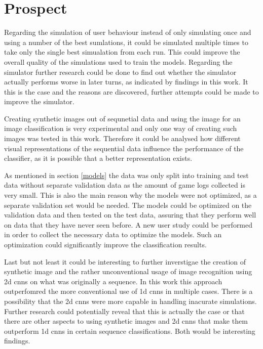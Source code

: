 \section{Prospect}
\label{prospect}
Regarding the simulation of user behaviour instead of only simulating once and using a number of the best sumlations, it could be simulated multiple times to take only the single best simualation from each run. This could improve the overall quality of the simulations used to train the models. Regarding the simulator further research could be done to find out whether the simulator actually performs worse in later turns, as indicated by findings in this work. It this is the case and the reasons are discovered, further attempts could be made to improve the simulator.

Creating synthetic images out of sequnetial data and using the image for an image classification is very experimental and only one way of creating such images was tested in this work. Therefore it could be analysed how different visual representations of the sequential data influence the performance of the classifier, as it is possible that a better representation exists. 

As mentioned in section \ref{models}  the data was only split into training and test data without separate validation data as the amount of game logs collected is very small. This is also the main reason why the models were not optimized, as a separate validation set would be needed. The models could be optimized on the validation data and then tested on the test data, assuring that they perform well on data that they have never seen before. A new user study could be performed in order to collect the necessary data to optimize the models. Such an optimization could significantly improve the classification results. 

Last but not least it could be interesting to further inverstigae the creation of synthetic image and the rather unconventional usage of image recognition using 2d cnns on what was originally a sequence. In this work this approach outperfomred the more conventional use of 1d cnns in multiple cases. There is a possibility that the 2d cnns were more capable in handling inacurate simulations. Further research could potentially reveal that this is actually the case or that there are other aspects to using synthetic images and 2d cnns that make them outperform 1d cnns in certain sequence classifications. Both would be interesting findings.



